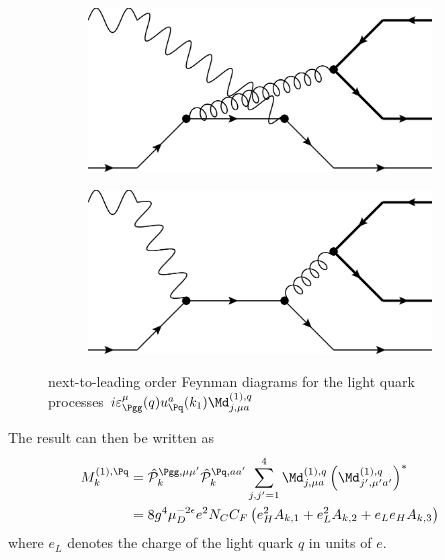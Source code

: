 \begin{figure}[ht!]
\begin{subfigure}[t]{.23\textwidth}
	\caption{}
\end{subfigure}\hspace{.02\textwidth}%
\begin{subfigure}[t]{.23\textwidth}
	\includegraphics[width=\textwidth]{pyfeyn/nlo-q-3}
	\caption{}
\end{subfigure}\hspace{.02\textwidth}%
\begin{subfigure}[t]{.23\textwidth}
	\includegraphics[width=\textwidth]{pyfeyn/nlo-q-4}
	\caption{}
\end{subfigure}
\caption{next-to-leading order Feynman diagrams for the light quark processes $i\varepsilon_{\Pgg}^\mu(q) u_{\Pq}^a(k_1)\Md^{(1),q}_{j,\mu a}$ }\label{fig:FeynNLOq}
\end{figure}

The result can then be written as
\begin{align}
M_k^{(1),\Pq} &=\hat {\mathcal P}_{k}^{\Pgg,\mu\mu'}\hat {\mathcal P}_{k}^{\Pq,aa'}\sum_{j,j'=1}^4\Md^{(1),q}_{j,\mu a}\left(\Md^{(1),q}_{j',\mu' a'}\right)^*\\
 &= 8g^4\mu_D^{-2\epsilon}e^2 N_C C_F\left( e_H^2 A_{k,1} +  e_L^2 A_{k,2} +  e_L e_H A_{k,3} \right)
\end{align}
where $e_L$ denotes the charge of the light quark $q$ in units of $e$.

